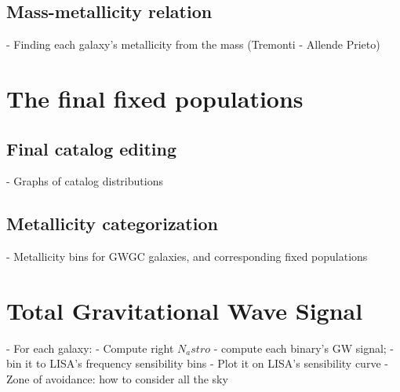 \subsection{Mass-metallicity relation}

    - Finding each galaxy's metallicity from the mass (Tremonti - Allende Prieto)


\section{The final fixed populations}

\subsection{Final catalog editing}

    - Graphs of catalog distributions

\subsection{Metallicity categorization}

    - Metallicity bins for GWGC galaxies, and corresponding fixed populations


\section{Total Gravitational Wave Signal}
- For each galaxy:
    - Compute right $N_astro$
    - compute each binary's GW signal;
    - bin it to LISA's frequency sensibility bins
    - Plot it on LISA's sensibility curve
- Zone of avoidance: how to consider all the sky


